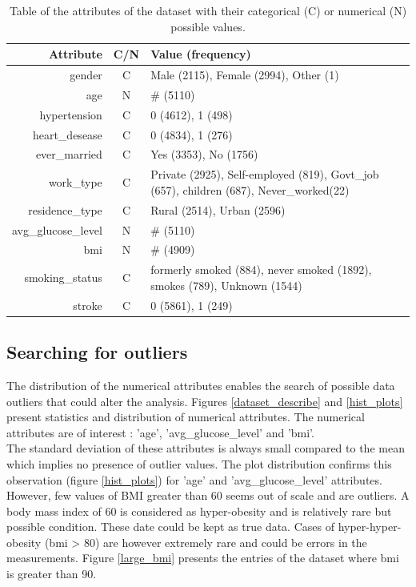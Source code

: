 \begin{table}[H]\begin{tabular}{rcm{11cm}}
\textbf{Attribute} & \textbf{C/N} & \textbf{Value (frequency)}\\\hline\hline
gender             & C & Male (2115), Female (2994), Other (1)\\
age                & N & \# (5110)\\
hypertension       & C & 0 (4612), 1 (498)\\
heart\_desease     & C & 0 (4834), 1 (276)\\
ever\_married      & C & Yes (3353), No (1756)\\
work\_type         & C & Private (2925), Self-employed (819), Govt\_job (657), children (687), Never\_worked(22)\\
residence\_type    & C & Rural (2514), Urban (2596) \\
avg\_glucose\_level& N & \# (5110)\\
bmi                & N & \# (4909)\\
smoking\_status    & C & formerly smoked (884), never smoked (1892), smokes (789), Unknown (1544)\\
stroke             & C & 0 (5861), 1 (249)\\
\end{tabular}
\caption{Table of the attributes of the dataset with their categorical (C) or numerical (N) possible values.}
\label{table_attributes_2}
\end{table}

\subsection{Searching for outliers}
The distribution of the numerical attributes enables the search of possible data outliers that could 
alter the analysis. Figures \ref{dataset_describe} and \ref{hist_plots} present statistics and 
distribution of numerical attributes. The numerical attributes are of interest : 'age', 
'avg\_glucose\_level' and 'bmi'. \\

The standard deviation of these attributes is always small compared to the mean which implies no 
presence of outlier values. The plot distribution confirms this observation (figure \ref{hist_plots}) 
for 'age' and 'avg\_glucose\_level' attributes. However, few values of BMI greater than 60 seems out 
of scale and are outliers. A body mass index of 60 is considered as hyper-obesity and is relatively 
rare but possible condition. These date could be kept as true data. Cases of hyper-hyper-obesity 
(bmi > 80) are however extremely rare and could be errors in the measurements. Figure \ref{large_bmi} 
presents the entries of the dataset where bmi is greater than 90.

